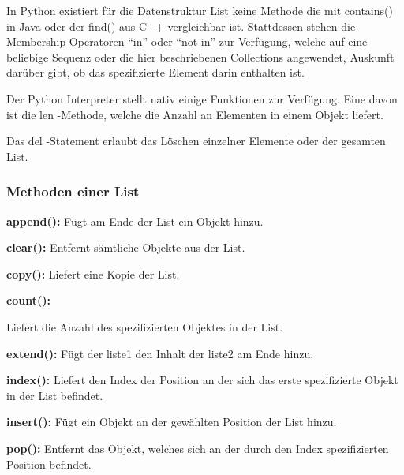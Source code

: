 In Python existiert für die Datenstruktur List keine Methode die mit contains() in Java oder der find() aus C++ vergleichbar ist. Stattdessen stehen die Membership Operatoren “in” oder “not in” zur Verfügung, welche auf eine beliebige Sequenz oder die hier beschriebenen Collections angewendet, Auskunft darüber gibt, ob das spezifizierte Element darin enthalten ist.

    
Der Python Interpreter stellt nativ einige Funktionen zur Verfügung. Eine davon ist die len -Methode, welche die Anzahl an Elementen in einem Objekt liefert.

    
Das del -Statement erlaubt das Löschen einzelner Elemente oder der gesamten List.

    

\subsubsection{Methoden einer List}

\textbf{append():}
Fügt am Ende der List ein Objekt hinzu.


\textbf{clear():}
Entfernt sämtliche Objekte aus der List.


\textbf{copy():}
Liefert eine Kopie der List.

    
\textbf{count():}

Liefert die Anzahl des spezifizierten Objektes in der List.
    
\textbf{extend():} 
Fügt der liste1 den Inhalt der liste2 am Ende hinzu.

    
\textbf{index():}
Liefert den Index der Position an der sich das erste spezifizierte Objekt in der List befindet.

    
\textbf{insert():}
Fügt ein Objekt an der gewählten Position der List hinzu.


\textbf{pop():}
Entfernt das Objekt, welches sich an der durch den Index spezifizierten Position befindet.

    
